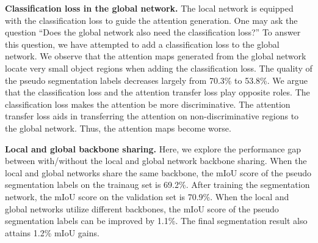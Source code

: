 \documentclass[10pt,twocolumn,letterpaper]{article}
\newcommand{\myParaP}[1]{\vspace{.05in}\noindent\textbf{#1}}
\begin{document}
\myParaP{Classification loss in the global network. } 
The local network is equipped with the 
classification loss to guide the attention generation.
One may ask the question ``Does the global network also need the classification loss?''
To answer this question, we have attempted to add
a classification loss to the global network.
We observe that the attention maps generated from the global network 
locate very small object regions when adding the classification loss.
The quality of the pseudo segmentation labels decreases largely from 70.3\% to 53.8\%.
We argue that the classification loss and the attention transfer loss play opposite roles.
The classification loss makes the attention be more discriminative.
The attention transfer loss aids in transferring the attention 
on non-discriminative regions to the global network.
Thus, the attention maps become worse.

\myParaP{Local and global backbone sharing. } 
Here, we explore the performance gap between with/without 
the local and global network backbone sharing.
When the local and global networks share the same backbone, 
the mIoU score of the pseudo segmentation labels on the trainaug set is 69.2\%.
After training the segmentation network, the mIoU score on the validation set is 70.9\%.
When the local and global networks utilize different backbones, 
the mIoU score of the pseudo segmentation labels can be improved by 1.1\%.
The final segmentation result also attains 1.2\% mIoU gains.
\end{document}
